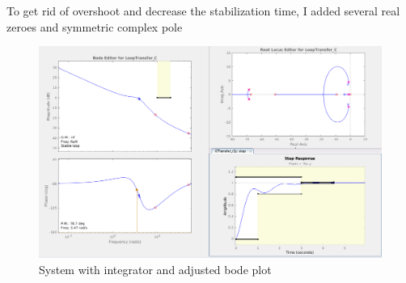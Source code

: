 \documentclass{article}
\begin{document}
\noindent
To get rid of overshoot and decrease the stabilization time, I added several real zeroes and symmetric complex pole

\begin{figure}[hbt!]
        \centering
        \includegraphics[scale=0.3]{hw3_43.png}
        \caption{System with integrator and adjusted bode plot}
\end{figure}
\end{document}
